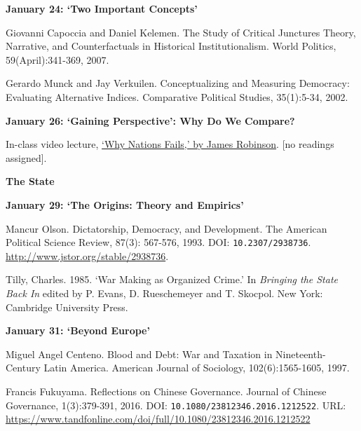 \documentclass[letterpaper]{article}
\renewenvironment{itemize}{
  \begin{list}{}{
    \setlength{\leftmargin}{1.5em}
  }
}{
  \end{list}
}
\begin{document}
\begin{enumerate}
\begin{itemize}
		\item {\bf January 24: `Two Important Concepts'}
			\begin{itemize}	
				\item[$\bullet$] Giovanni Capoccia and Daniel Kelemen. The Study of Critical Junctures Theory, Narrative, and Counterfactuals in Historical Institutionalism. World Politics, 59(April):341-369, 2007.
				\item[$\bullet$] Gerardo Munck and Jay Verkuilen. Conceptualizing and Measuring Democracy: Evaluating Alternative Indices. Comparative Political Studies, 35(1):5-34, 2002.
			\end{itemize}



		\item {\bf January 26: `Gaining Perspective': Why Do We Compare?}
			\begin{itemize}	
				\item[$\bullet$] In-class video lecture, \href{https://www.youtube.com/watch?v=jsZDlBU36n0}{`Why Nations Fails,' by James Robinson}. [no readings assigned].
			\end{itemize}

	\end{itemize}


\item {\bf The State}
	\begin{itemize}
		
	\item {\bf January 29: `The Origins: Theory and Empirics'}
		\begin{itemize} 
			\item[$\bullet$] Mancur Olson. Dictatorship, Democracy, and Development. The American Political Science Review, 87(3): 567-576, 1993. DOI: \texttt{10.2307/2938736}. \url{http://www.jstor.org/stable/2938736}.
			\item[$\bullet$] Tilly, Charles. 1985. `War Making as Organized Crime.' In \emph{Bringing the State Back In} edited by P. Evans, D. Rueschemeyer and T. Skocpol. New York: Cambridge University Press.
		\end{itemize}
		

	\item {\bf January 31: `Beyond Europe'}
		\begin{itemize} 
			\item[$\bullet$] Miguel Angel Centeno. Blood and Debt: War and Taxation in Nineteenth-Century Latin America. American Journal of Sociology, 102(6):1565-1605, 1997.
			\item[$\bullet$] Francis Fukuyama. Reflections on Chinese Governance. Journal of Chinese Governance, 1(3):379-391, 2016. DOI: \texttt{10.1080/23812346.2016.1212522}. URL: \url{https://www.tandfonline.com/doi/full/10.1080/23812346.2016.1212522}
		\end{itemize}


\end{itemize}
\end{enumerate}
\end{document}
